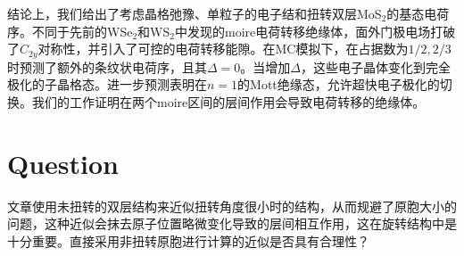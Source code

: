 \documentclass[reprint, aps, prb, showkeys]{revtex4-2}
\begin{document}
结论上，我们给出了考虑晶格弛豫、单粒子的电子结和扭转双层MoS$_2$的基态电荷序。不同于先前的WSe$_2$和WS$_2$中发现的moire电荷转移绝缘体，面外门极电场打破了$C_{2y}$对称性，并引入了可控的电荷转移能隙。在MC模拟下，在占据数为$1/2, 2/3$时预测了额外的条纹状电荷序，且其$\Delta = 0$。当增加$\Delta$，这些电子晶体变化到完全极化的子晶格态。进一步预测表明在$n = 1$的Mott绝缘态，允许超快电子极化的切换。我们的工作证明在两个moire区间的层间作用会导致电荷转移的绝缘体。

\section{Question}
文章使用未扭转的双层结构来近似扭转角度很小时的结构，从而规避了原胞大小的问题，这种近似会抹去原子位置略微变化导致的层间相互作用，这在旋转结构中是十分重要。直接采用非扭转原胞进行计算的近似是否具有合理性？
\end{document}
